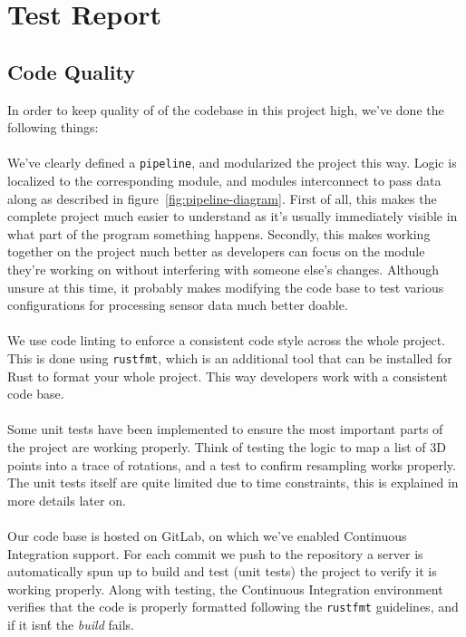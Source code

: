 \documentclass{standalone}
\begin{document}
  \section{Test Report}
  \subsection{Code Quality}
  In order to keep quality of of the codebase in this project high, we've done
  the following things:

  \paragraph{}
  We've clearly defined a \verb_pipeline_, and modularized the project this way.
  Logic is localized to the corresponding module, and modules interconnect to
  pass data along as described in figure~\ref{fig:pipeline-diagram}.
  First of all, this makes the complete project much easier to
  understand as it's usually immediately visible in what part of the program
  something happens. Secondly, this makes working together on the project much
  better as developers can focus on the module they're working on without
  interfering with someone else's changes. Although unsure at this time,
  it probably makes modifying the code base to test various configurations for
  processing sensor data much better doable.

  \paragraph{}
  We use code linting to enforce a consistent code style across the whole
  project. This is done using \verb_rustfmt_, which is an additional tool that
  can be installed for Rust to format your whole project. This way developers
  work with a consistent code base.

  \paragraph{}
  Some unit tests have been implemented to ensure the most important parts of
  the project are working properly. Think of testing the logic to map a list of
  3D points into a trace of rotations, and a test to confirm resampling works
  properly. The unit tests itself are quite limited due to time constraints,
  this is explained in more details later on.

  \paragraph{}
  Our code base is hosted on GitLab, on which we've enabled Continuous
  Integration support. For each commit we push to the repository a server is
  automatically spun up to build and test (unit tests) the project to verify
  it is working properly. Along with testing, the Continuous Integration
  environment verifies that the code is properly formatted following the
  \verb_rustfmt_ guidelines, and if it isn\'t the \emph{build} fails.
\end{document}
